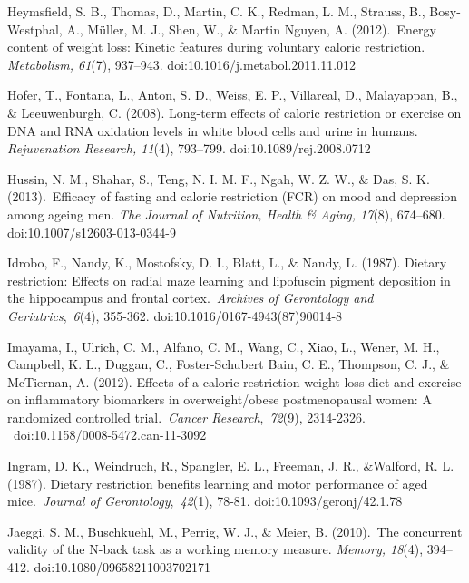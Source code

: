 \documentclass[authordate, empirical]{jote-new-article}
\begin{document}
Heymsfield, S. B., Thomas, D., Martin, C. K., Redman, L. M., Strauss, B., Bosy-Westphal, A., Müller, M. J., Shen, W., \& Martin Nguyen, A. (2012). Energy content of weight loss: Kinetic features during voluntary caloric restriction.\emph{ Metabolism, 61}(7), 937--943. doi:10.1016/j.metabol.2011.11.012



Hofer, T., Fontana, L., Anton, S. D., Weiss, E. P., Villareal, D., Malayappan, B., \& Leeuwenburgh, C. (2008). Long-term effects of caloric restriction or exercise on DNA and RNA oxidation levels in white blood cells and urine in humans. \emph{Rejuvenation Research, 11}(4), 793--799. doi:10.1089/rej.2008.0712



Hussin, N. M., Shahar, S., Teng, N. I. M. F., Ngah, W. Z. W., \& Das, S. K. (2013). Efficacy of fasting and calorie restriction (FCR) on mood and depression among ageing men.\emph{ The Journal of Nutrition, Health \& Aging, 17}(8), 674--680. doi:10.1007/s12603-013-0344-9



Idrobo, F., Nandy, K., Mostofsky, D. I., Blatt, L., \& Nandy, L. (1987). Dietary restriction: Effects on radial maze learning and lipofuscin pigment deposition in the hippocampus and frontal cortex. \emph{Archives of Gerontology and Geriatrics}, \emph{6}(4), 355-362. doi:10.1016/0167-4943(87)90014-8



Imayama, I., Ulrich, C. M., Alfano, C. M., Wang, C., Xiao, L., Wener, M. H., Campbell, K. L., Duggan, C., Foster-Schubert Bain, C. E., Thompson, C. J., \& McTiernan, A. (2012). Effects of a caloric restriction weight loss diet and exercise on inflammatory biomarkers in overweight/obese postmenopausal women: A randomized controlled trial. \emph{Cancer Research}, \emph{72}(9), 2314-2326.  doi:10.1158/0008-5472.can-11-3092



Ingram, D. K., Weindruch, R., Spangler, E. L., Freeman, J. R., \&Walford, R. L. (1987). Dietary restriction benefits learning and motor performance of aged mice. \emph{Journal of Gerontology}, \emph{42}(1), 78-81. doi:10.1093/geronj/42.1.78



Jaeggi, S. M., Buschkuehl, M., Perrig, W. J., \& Meier, B. (2010). The concurrent validity of the N-back task as a working memory measure.\emph{ Memory, 18}(4), 394--412.\emph{ }doi:10.1080/09658211003702171\emph{ }
\end{document}
